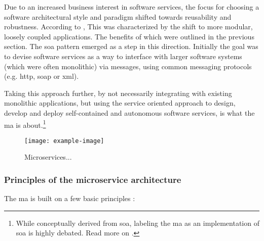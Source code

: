 Due to an increased business interest in software services, the focus for
choosing a software architectural style and paradigm shifted towards reusability
and robustness. According to \textcite{Dragoni_etal_2018}, This was
characterized by the shift to more modular, loosely coupled applications. The
benefits of which were outlined in the previous section. The \gls{soa} pattern
emerged as a step in this direction. Initially the goal was to devise software
services as a way to interface with larger software systems (which were often
monolithic) via messages, using common messaging protocols (e.g. \gls{http},
\gls{soap} or \gls{xml}).

Taking this approach further, by not necessarily integrating with existing
monolithic applications, but using the service oriented approach to design,
develop and deploy self-contained and autonomous software services, is what the
\gls{ma} is about.\footnote{While conceptually derived from \gls{soa}, labeling
the \gls{ma} as an implementation of \gls{soa} is highly debated. Read more on
.}




\begin{figure} %
    \centering
    \texttt{[image: example-image]}
    \caption[Microservices]{Microservices...}
\end{figure}


\subsubsection{Principles of the microservice architecture}
\label{principles-of-the-mfa}

The \gls{ma} is built on a few basic principles \autocite{Dragoni_etal_2018}
\autocite{Dragoni_etal_2017} \autocite{Fowler_Microservices_2014}
\autocite{Gysels_2020} \autocite{Newman_2015}:


